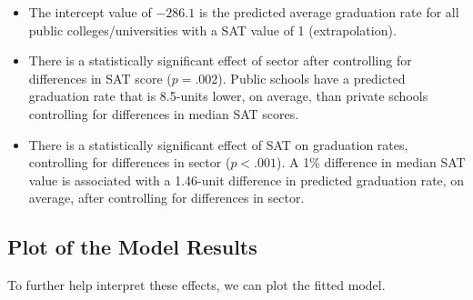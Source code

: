 \documentclass[]{book}
\newenvironment{Shaded}{\begin{snugshade}}{\end{snugshade}}
\newcommand{\CommentTok}[1]{\textcolor[rgb]{0.56,0.35,0.01}{\textit{#1}}}
\newcommand{\DataTypeTok}[1]{\textcolor[rgb]{0.13,0.29,0.53}{#1}}
\newcommand{\DecValTok}[1]{\textcolor[rgb]{0.00,0.00,0.81}{#1}}
\newcommand{\FloatTok}[1]{\textcolor[rgb]{0.00,0.00,0.81}{#1}}
\newcommand{\KeywordTok}[1]{\textcolor[rgb]{0.13,0.29,0.53}{\textbf{#1}}}
\newcommand{\NormalTok}[1]{#1}
\newcommand{\OperatorTok}[1]{\textcolor[rgb]{0.81,0.36,0.00}{\textbf{#1}}}
\newcommand{\StringTok}[1]{\textcolor[rgb]{0.31,0.60,0.02}{#1}}
\providecommand{\tightlist}{%
  \setlength{\itemsep}{0pt}\setlength{\parskip}{0pt}}
\begin{document}
\begin{itemize}
\tightlist
\item
  The intercept value of \(-286.1\) is the predicted average graduation rate for all public colleges/universities with a SAT value of 1 (extrapolation).
\item
  There is a statistically significant effect of sector after controlling for differences in SAT score (\(p=.002\)). Public schools have a predicted graduation rate that is 8.5-units lower, on average, than private schools controlling for differences in median SAT scores.
\item
  There is a statistically significant effect of SAT on graduation rates, controlling for differences in sector (\(p<.001\)). A 1\% difference in median SAT value is associated with a 1.46-unit difference in predicted graduation rate, on average, after controlling for differences in sector.
\end{itemize}

\hypertarget{plot-of-the-model-results}{%
\subsection{Plot of the Model Results}\label{plot-of-the-model-results}}

To further help interpret these effects, we can plot the fitted model.

\begin{Shaded}
\end{Shaded}
\end{document}
